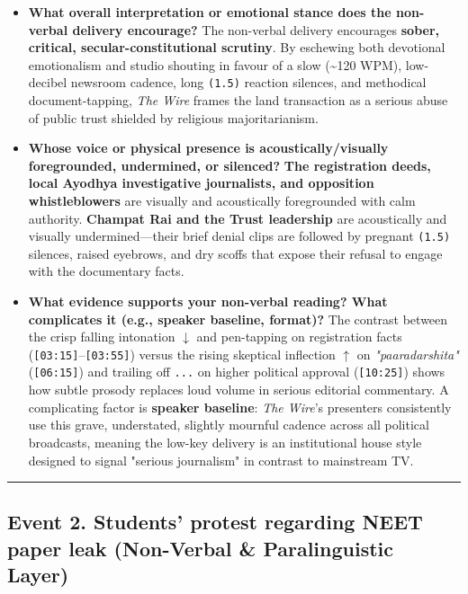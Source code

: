 \documentclass[10pt,a4paper]{article}
\begin{document}
\begin{itemize}
  \item \textbf{What overall interpretation or emotional stance does the non-verbal delivery encourage?}
The non-verbal delivery encourages \textbf{sober, critical, secular-constitutional scrutiny}. By eschewing both devotional emotionalism and studio shouting in favour of a slow (\textasciitilde{}120 WPM), low-decibel newsroom cadence, long \texttt{(1.5)} reaction silences, and methodical document-tapping, \textit{The Wire} frames the land transaction as a serious abuse of public trust shielded by religious majoritarianism.\par\smallskip
  \item \textbf{Whose voice or physical presence is acoustically/visually foregrounded, undermined, or silenced?}
\textbf{The registration deeds, local Ayodhya investigative journalists, and opposition whistleblowers} are visually and acoustically foregrounded with calm authority. \textbf{Champat Rai and the Trust leadership} are acoustically and visually undermined---their brief denial clips are followed by pregnant \texttt{(1.5)} silences, raised eyebrows, and dry scoffs that expose their refusal to engage with the documentary facts.\par\smallskip
  \item \textbf{What evidence supports your non-verbal reading? What complicates it (e.g., speaker baseline, format)?}
The contrast between the crisp falling intonation \texttt{$\downarrow$} and pen-tapping on registration facts (\texttt{[03:15]}--\texttt{[03:55]}) versus the rising skeptical inflection \texttt{$\uparrow$} on \textit{"paaradarshita"} (\texttt{[06:15]}) and trailing off \texttt{...} on higher political approval (\texttt{[10:25]}) shows how subtle prosody replaces loud volume in serious editorial commentary. A complicating factor is \textbf{speaker baseline}: \textit{The Wire}'s presenters consistently use this grave, understated, slightly mournful cadence across all political broadcasts, meaning the low-key delivery is an institutional house style designed to signal "serious journalism" in contrast to mainstream TV.\par\smallskip
\end{itemize}

\bigskip\hrule\bigskip

\subsection*{Event 2. Students' protest regarding NEET paper leak (Non-Verbal \& Paralinguistic Layer)}
\end{document}
